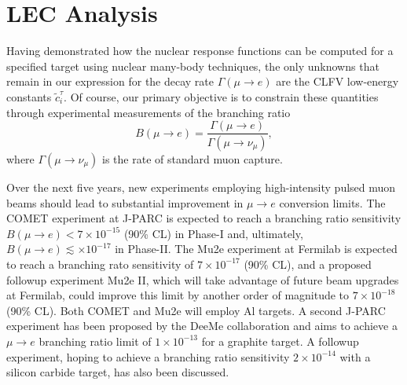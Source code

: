 \documentclass{book}[letterpaper,12pt]
\begin{document}
\chapter{LEC Analysis}
\label{chap:lec_analysis}
\thispagestyle{headings}
Having demonstrated how the nuclear response functions can be computed for a specified target using nuclear many-body techniques, the only unknowns that remain in our expression for the decay rate $\Gamma(\mu\rightarrow e)$ are the CLFV low-energy constants $\tilde{c}_i^{\tau}$. Of course, our primary objective is to constrain these quantities through experimental measurements of the branching ratio 
\begin{equation}
B\left(\mu\rightarrow e\right)=\frac{\Gamma\left(\mu\rightarrow e\right)}{\Gamma\left(\mu\rightarrow \nu_{\mu}\right)},
\end{equation}
where $\Gamma(\mu\rightarrow \nu_{\mu})$ is the rate of standard muon capture. 

Over the next five years, new experiments employing high-intensity pulsed muon beams should lead to substantial improvement in $\mu\rightarrow e$ conversion limits. The COMET experiment at J-PARC is expected to reach a branching ratio sensitivity $B(\mu\rightarrow e)<7\times 10^{-15}$ (90\% CL) in Phase-I and, ultimately, $B(\mu\rightarrow e)\lesssim\times 10^{-17}$ in Phase-II. The Mu2e experiment at Fermilab is expected to reach a branching rato sensitivity of $7\times 10^{-17}$ (90\% CL), and a proposed followup experiment Mu2e II, which will take advantage of future beam upgrades at Fermilab, could improve this limit by another order of magnitude to $7\times 10^{-18}$ (90\% CL). Both COMET and Mu2e will employ Al targets. A second J-PARC experiment has been proposed by the DeeMe collaboration \cite{Teshima:2019orf} and aims to achieve a $\mu\rightarrow e$ branching ratio limit of $1\times 10^{-13}$ for a graphite target. A followup experiment, hoping to achieve a branching ratio sensitivity $2\times 10^{-14}$ with a silicon carbide target, has also been discussed.
\end{document}
